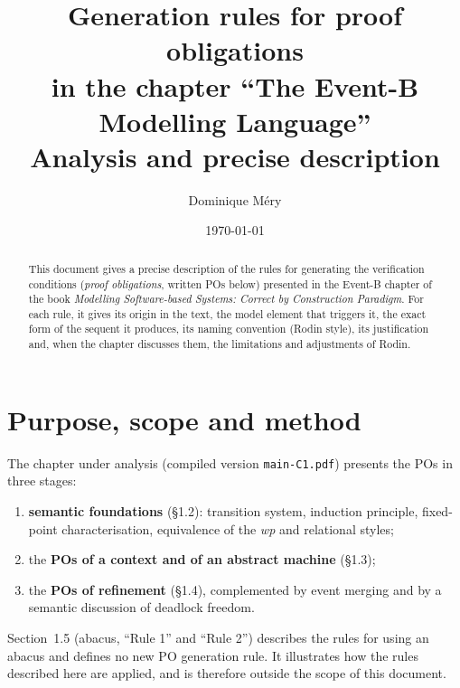 \documentclass[11pt,a4paper]{article}
\title{Generation rules for proof obligations\\
  in the chapter ``The Event-B Modelling Language''\\[2pt]
  \large Analysis and precise description}
\author{Dominique Méry}
\date{\today}
\begin{document}

\maketitle

\begin{abstract}
  This document gives a precise description of the rules for generating the
  verification conditions (\emph{proof obligations}, written POs below) presented in
  the Event-B chapter \cite{buneventb}  of the book \emph{Modelling Software-based Systems:
  Correct by Construction Paradigm}\cite{bun}. For each rule, it gives its origin
  in the text, the model element that triggers it, the exact form of the sequent it
  produces, its naming convention (Rodin style), its justification and, when the
  chapter discusses them, the limitations and adjustments of Rodin. 
 \end{abstract}

\tableofcontents

\section{Purpose, scope and method}

The chapter under analysis (compiled version \texttt{main-C1.pdf}) presents the POs
in three stages:
\begin{enumerate}
  \item \textbf{semantic foundations} (§1.2): transition system, induction
    principle, fixed-point characterisation, equivalence of the \emph{wp} and
    relational styles;
  \item the \textbf{POs of a context and of an abstract machine} (§1.3);
  \item the \textbf{POs of refinement} (§1.4), complemented by event merging and by
    a semantic discussion of deadlock freedom.
\end{enumerate}
Section~1.5 (abacus, ``Rule 1'' and ``Rule 2'') describes the rules for using an
abacus and defines no new PO generation rule. It illustrates how the rules
described here are applied, and is therefore outside the scope of this document.
\end{document}
